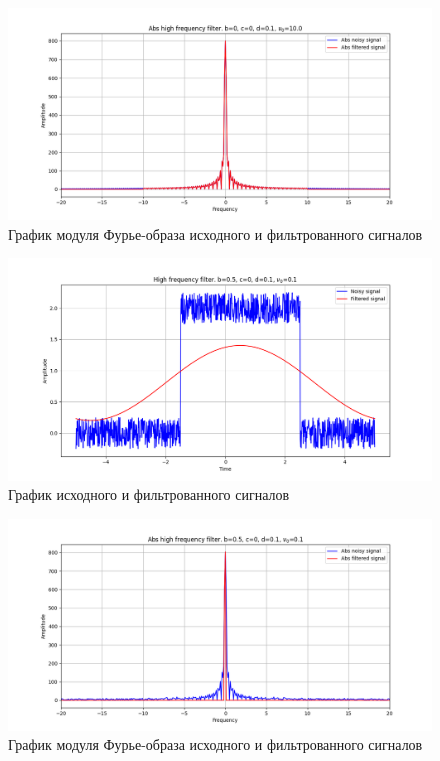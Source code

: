 \documentclass[a4paper, 12pt]{article}
\begin{document}
    \begin{figure}[!htb]
        \centering
        \includegraphics[scale=0.485]{4_abs_u_U_nohigh.png}
        \captionsetup{skip=0pt}
        \caption{График модуля Фурье-образа исходного и фильтрованного сигналов}
        \label{fig:fig10}
    \end{figure}
    \begin{figure}[!htb]
        \centering
        \includegraphics[scale=0.485]{11_u_flt_u_nohigh.png}
        \captionsetup{skip=0pt}
        \caption{График исходного и фильтрованного сигналов}
        \label{fig:fig11}
    \end{figure}
    \begin{figure}[!htb]
        \centering
        \includegraphics[scale=0.485]{11_abs_u_U_nohigh.png}
        \captionsetup{skip=0pt}
        \caption{График модуля Фурье-образа исходного и фильтрованного сигналов}
        \label{fig:fig12}
    \end{figure}
\end{document}
